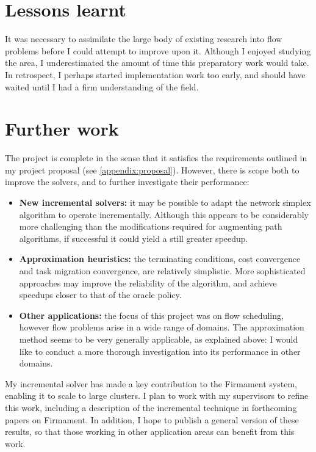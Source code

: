 \section{Lessons learnt}

It was necessary to assimilate the large body of existing research into flow problems before I could attempt to improve upon it. Although I enjoyed studying the area, I underestimated the amount of time this preparatory work would take. In retrospect, I perhaps started implementation work too early, and should have waited until I had a firm understanding of the field.

\section{Further work}

The project is complete in the sense that it satisfies the requirements outlined in my project proposal (see \cref{appendix:proposal}). However, there is scope both to improve the solvers, and to further investigate their performance:

\begin{itemize}
    \item \textbf{New incremental solvers:} it may be possible to adapt the network simplex algorithm to operate incrementally. Although this appears to be considerably more challenging than the modifications required for augmenting path algorithms, if successful it could yield a still greater speedup.
    \item \textbf{Approximation heuristics:} the terminating conditions, cost convergence and task migration convergence, are relatively simplistic. More sophisticated approaches may improve the reliability of the algorithm, and achieve speedups closer to that of the oracle policy.
    \item \textbf{Other applications:} the focus of this project was on flow scheduling, however flow problems arise in a wide range of domains. The approximation method seems to be very generally applicable, as explained above: I would like to conduct a more thorough investigation into its performance in other domains. 
\end{itemize}

My incremental solver has made a key contribution to the Firmament system, enabling it to scale to large clusters. I plan to work with my supervisors to refine this work, including a description of the incremental technique in forthcoming papers on Firmament. In addition, I hope to publish a general version of these results, so that those working in other application areas can benefit from this work.
